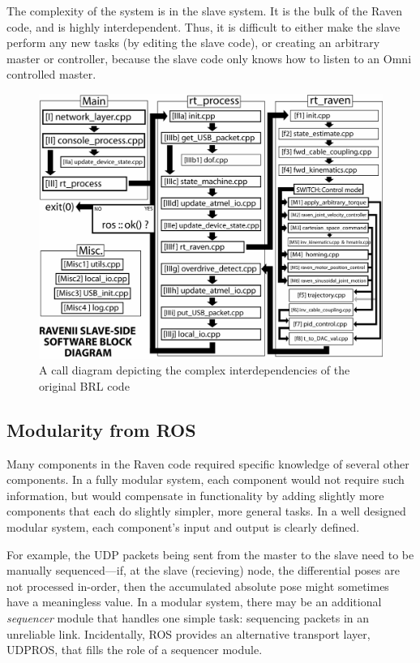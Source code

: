 \documentclass[letterpaper,twocolumn,10pt]{article}
\begin{document}
The complexity of the system is in the slave system. It is the bulk 
of the Raven code, and is highly interdependent. Thus, it is difficult 
to either make the slave perform any new tasks (by editing the slave 
code), or creating an arbitrary master or controller, because the 
slave code only knows how to listen to an Omni controlled master.

\begin{figure}[h]
  \includegraphics[scale=0.33]{RavenII_Block_Diagram.jpg}
  \caption{A call diagram depicting the complex interdependencies of the original BRL code}
  \label{fig:block_diagram}
\end{figure}

\subsection{Modularity from ROS}

Many components in the Raven code required specific knowledge of
several other components. In a fully modular system, each component
would not require such information, but would compensate in
functionality by adding slightly more components that each do slightly
simpler, more general tasks. In a well designed modular system, each
component's input and output is clearly defined.

For example, the UDP packets being sent from the master to the slave
need to be manually sequenced---if, at the slave (recieving) node, the
differential poses are not processed in-order, then the accumulated
absolute pose might sometimes have a meaningless value. In a modular
system, there may be an additional \emph{sequencer} module that
handles one simple task: sequencing packets in an unreliable
link. Incidentally, ROS provides an alternative transport layer, 
UDPROS, that fills the role of a sequencer module.
\end{document}
